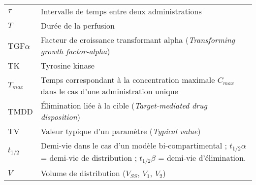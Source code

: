 \begin{tabularx}{30em}{X X}
$\tau$ & 	Intervalle de temps entre deux administrations\\
$T$ & 	Durée de la perfusion\\
TGF$\alpha$ & 	Facteur de croissance transformant alpha (\textit{Transforming growth factor-alpha})\\
TK & 	Tyrosine kinase \\
$T_{max}$ & 	Temps correspondant à la concentration maximale $C_{max}$ dans le cas d'une administration unique\\
TMDD & 	Élimination liée à la cible (\textit{Target-mediated drug disposition})\\
TV & 	Valeur typique d'un paramètre (\textit{Typical value})\\
$t_{1/2}$ & 	Demi-vie dans le cas d'un modèle bi-compartimental ; $t_{1/2}\alpha$ = demi-vie de distribution ; $t_{1/2}\beta$ = demi-vie d'élimination.\\
$V$ & 	Volume de distribution ($V_{SS}$, $V_1$, $V_2$)\\
\end{tabularx}
